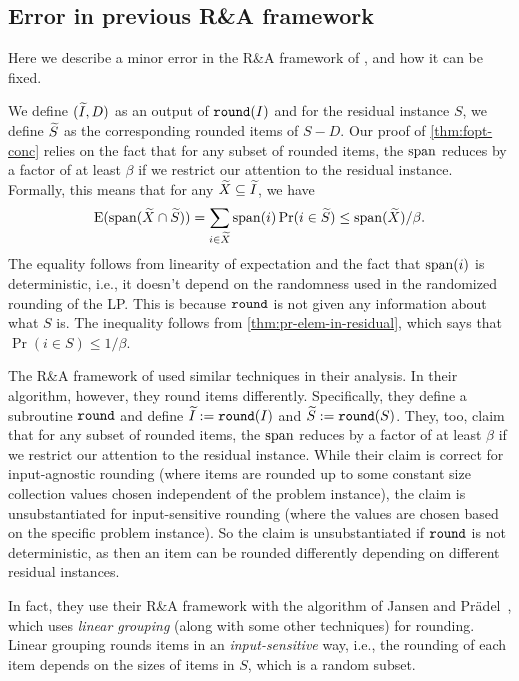 \subsection{Error in previous R\&A framework}
\label{sec:rna-extra:bugfix}

Here we describe a minor error in the R\&A framework of \cite{khan-thesis},
and how it can be fixed.

We define $(\widetilde{I}, D)$ as an output of $\operatorname{\mathtt{round}}(I)$ and for the residual instance $S$,
we define $\widetilde{S}$ as the corresponding rounded items of $S - D$.
Our proof of \cref{thm:fopt-conc} relies on the fact that for any subset
of rounded items, the $\operatorname{span}$ reduces by a factor of at least $\beta$
if we restrict our attention to the residual instance.
Formally, this means that for any $\widetilde{X} \subseteq \widetilde{I}$, we have
\[ \operatorname*{E}(\operatorname{span}(\widetilde{X} \cap \widetilde{S}))
= \sum_{i \in \widetilde{X}} \operatorname{span}(i)\Pr(i \in \widetilde{S})
\le \operatorname{span}(\widetilde{X})/\beta. \]
The equality follows from linearity of expectation and the fact that
$\operatorname{span}(i)$ is deterministic, i.e., it doesn't depend on the randomness
used in the randomized rounding of the \config{} LP.
This is because $\operatorname{\mathtt{round}}$ is not given any information about what $S$ is.
The inequality follows from \cref{thm:pr-elem-in-residual},
which says that $\Pr(i \in S) \le 1/\beta$.

The R\&A framework of \cite{khan-thesis} used similar techniques in their analysis.
In their algorithm, however, they round items differently.
Specifically, they define a subroutine $\operatorname{\mathtt{round}}$ and define $\widetilde{I} := \operatorname{\mathtt{round}}(I)$
and $\widetilde{S} := \operatorname{\mathtt{round}}(S)$.
They, too, claim that for any subset of rounded items,
the $\operatorname{span}$ reduces by a factor of at least $\beta$
if we restrict our attention to the residual instance.
While their claim is correct for input-agnostic rounding
(where items are rounded up to some constant size collection
values chosen independent of the problem instance),
the claim is unsubstantiated for input-sensitive rounding
(where the values are chosen based on the specific problem instance).
So the claim is unsubstantiated if $\operatorname{\mathtt{round}}$ is not deterministic, as
then an item can be rounded differently depending on
different residual instances.

In fact, they use their R\&A framework with the algorithm of
Jansen and Pr\"adel~\cite{jansen2016new}, which uses
\emph{linear grouping} (along with some other techniques) for rounding.
Linear grouping rounds items in an \emph{input-sensitive} way, i.e.,
the rounding of each item depends on the sizes of items in $S$,
which is a random subset.
